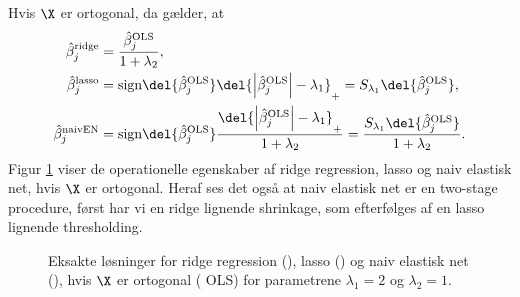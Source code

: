\begin{lem}
Hvis \(\X\) er ortogonal, da gælder, at
\begin{align}
\hat{\beta}_j^\text{ridge} &= \frac{\hat{\beta}_j^\text{OLS}}{1+\lambda_2}, \label{eq:orto_ridge} \\
\hat{\beta}_j^\text{lasso} &= \text{sign} \del{\hat{\beta}_j^\text{OLS}} \del{\left\vert \hat{\beta}_j^\text{OLS} \right\vert - \lambda_1}_+ =S_{\lambda_1} \del{ \hat{\beta}_j^\text{OLS}}, \label{eq:orto_lasso} \\
\hat{\beta}_j^\text{naivEN} &= \text{sign} \del{\hat{\beta}_j^\text{OLS}} \frac{\del{\left\vert \hat{\beta}_j^\text{OLS} \right\vert - \lambda_1}_+}{1+\lambda_2} = \frac{S_{\lambda_1} \del{ \hat{\beta}_j^\text{OLS}} }{1+\lambda_2} . \label{eq:orto_naivEN}
\end{align}
Figur \ref{fig:elastisk2} viser de operationelle egenskaber af ridge regression, lasso og naiv elastisk net, hvis \(\X\) er ortogonal. Heraf ses det også at naiv elastisk net er en two-stage procedure, først har vi en ridge lignende shrinkage, som efterfølges af en lasso lignende thresholding.
%
\begin{figure}[H]
\centering
\scalebox{0.8}{}
\caption[optional short text]{Eksakte løsninger for ridge regression (), lasso () og naiv elastisk net (), hvis \(\X\) er ortogonal ( OLS) for parametrene \(\lambda_1=2\) og \(\lambda_2=1\).} \label{fig:elastisk2}
\end{figure}
%
\end{lem}
%
